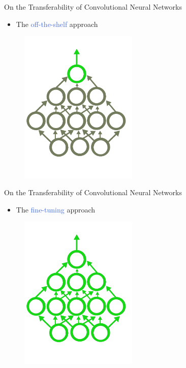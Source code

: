 \documentclass{beamer}
\begin{document}
\begin{frame}{On the Transferability of Convolutional Neural Networks}
	
	\bigskip

	\begin{itemize}
		\item The \textcolor{RoyalBlue}{off-the-shelf} approach 
	\end{itemize}

	\bigskip

	\begin{figure}
		\includegraphics[width=0.5\textwidth]{figures/frozen_net.pdf}
	\end{figure}

\end{frame}


\begin{frame}{On the Transferability of Convolutional Neural Networks}
	
	\bigskip

	\begin{itemize}
		\item The \textcolor{RoyalBlue}{fine-tuning} approach 
	\end{itemize}

	\bigskip

	\begin{figure}
		\includegraphics[width=0.5\textwidth]{figures/fine_tuning_net.pdf}
	\end{figure}

\end{frame}
\end{document}
